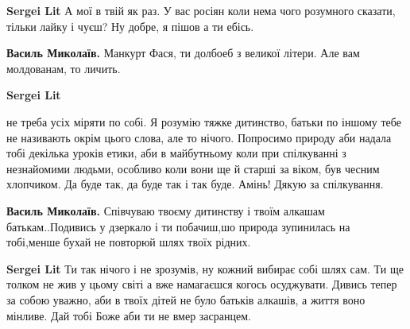 \begin{itemize}
\begin{itemize}
 
\textbf{Sergei Lit} А мої в твій як раз. У вас росіян коли нема чого розумного сказати, тільки лайку і чуєш? Ну добре, я пішов а ти ебісь.

 
\textbf{Василь Миколаїв.} Манкурт Фася, ти долбоеб з великої літери. Але вам молдованам, то личить.

 
\textbf{Sergei Lit} 

не треба усіх міряти по собі. Я розумію тяжке дитинство, батьки по іншому тебе
не називають окрім цього слова, але то нічого. Попросимо природу аби надала
тобі декілька уроків етики, аби в майбутньому коли при спілкуванні з
незнайомими людьми, особливо коли вони ще й старші за віком, був чесним
хлопчиком. Да буде так, да буде так і так буде. Амінь! Дякую за спілкування.

 
\textbf{Василь Миколаїв.} Співчуваю твоєму дитинству і твоїм алкашам батькам..Подивись у дзеркало і ти побачиш,шо природа зупинилась на тобі,менше бухай не повторюй шлях твоїх рідних.

 
\textbf{Sergei Lit} Ти так нічого і не зрозумів, ну кожний вибирає собі шлях сам. Ти ще толком не жив у цьому світі а вже намагаєшся когось осуджувати. Дивись тепер за собою уважно, аби в твоїх дітей не було батьків алкашів, а життя воно мінливе. Дай тобі Боже аби ти не вмер засранцем.


\end{itemize}
\end{itemize}
